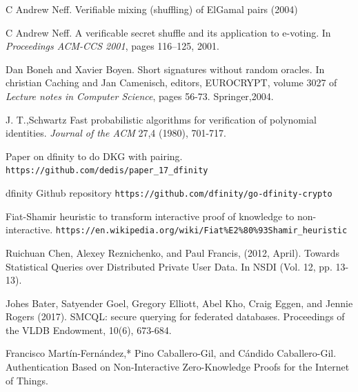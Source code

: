 \documentclass{article}
\begin{document}
\begin{thebibliography}{9}
C Andrew Neff. Verifiable mixing (shuffling) of ElGamal pairs (2004)

C Andrew Neff. A verificable secret shuffle and its application to e-voting. In \textit{Proceedings ACM-CCS 2001}, pages 116--125, 2001.

Dan Boneh and Xavier Boyen. Short signatures without random oracles. In christian Caching and Jan Camenisch, editors, EUROCRYPT, volume 3027 of \textit{Lecture notes in Computer Science}, pages 56-73. Springer,2004.

J. T.,Schwartz Fast probabilistic algorithms for verification of polynomial identities. \textit{Journal of the ACM} 27,4 (1980), 701-717.


Paper on dfinity to do DKG with pairing.
\texttt{https://github.com/dedis/paper\_17\_dfinity}

dfinity Github repository
\texttt{https://github.com/dfinity/go-dfinity-crypto}

Fiat-Shamir heuristic to transform interactive proof of knowledge to non-interactive.
\texttt{https://en.wikipedia.org/wiki/Fiat\%E2\%80\%93Shamir\_heuristic}

Ruichuan Chen, Alexey Reznichenko, and Paul Francis, (2012, April). Towards Statistical Queries over Distributed Private User Data. In NSDI (Vol. 12, pp. 13-13).


Johes Bater, Satyender Goel, Gregory Elliott, Abel Kho, Craig Eggen, and Jennie Rogers (2017). SMCQL: secure querying for federated databases. Proceedings of the VLDB Endowment, 10(6), 673-684.

Francisco Martín-Fernández,* Pino Caballero-Gil, and Cándido Caballero-Gil. Authentication Based on Non-Interactive Zero-Knowledge Proofs for the Internet of Things.

\end{thebibliography}
\end{document}
